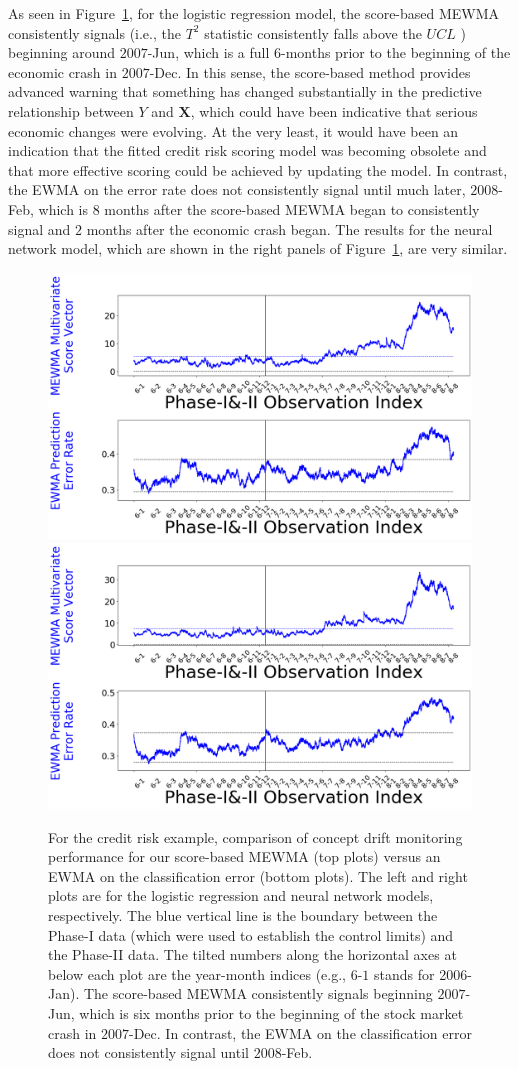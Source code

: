 \documentclass[twoside,11pt]{article}
\begin{document}
As seen in Figure~\ref{fig:credit_default}, for the logistic regression model, the score-based MEWMA consistently signals (i.e., the $T^2$ statistic consistently falls above the $UCL$ ) beginning around $2007$-Jun, which is a full $6$-months prior to the beginning of the economic crash in $2007$-Dec. In this sense, the score-based method provides advanced warning that something has changed substantially in the predictive relationship between $Y$ and $\bm{X}$, which could have been indicative that serious economic changes were evolving. At the very least, it would have been an indication that the fitted credit risk scoring model was becoming obsolete and that more effective scoring could be achieved by updating the model. In contrast, the EWMA on the error rate does not consistently signal until much later, $2008$-Feb, which is $8$ months after the score-based MEWMA began to consistently signal and $2$ months after the economic crash began. The results for the neural network model, which  are shown in the right panels of Figure~\ref{fig:credit_default}, are very similar. 

\begin{figure}[!htbp]
\centering
\includegraphics[width = 0.49\linewidth]{../figures/v14/credit_default/logi_scal_train_PI/credit_logi_1e-08_0_0001_0_001_99_0.png}
\includegraphics[width = 0.49\linewidth]{../figures/v14/credit_default/logi_nnet_scal_train_PI/credit_logi_0_002_0_0001_0_001_99_0.png}
  \caption{
For the credit risk example, comparison of concept drift monitoring performance for our score-based MEWMA (top plots) versus an EWMA on the classification error (bottom plots). The left and right plots are for the logistic regression and neural network models, respectively. The blue vertical line is the boundary between the Phase-I data (which were used to establish the control limits) and the Phase-II data. The tilted numbers along the horizontal axes at below each plot are the year-month indices (e.g., $6$-$1$ stands for 2006-Jan). The score-based MEWMA consistently signals beginning $2007$-Jun, which is six months prior to the beginning of the stock market crash in $2007$-Dec. In contrast, the EWMA on the classification error does not consistently signal until $2008$-Feb. 
}
\label{fig:credit_default}
\end{figure}
\end{document}
